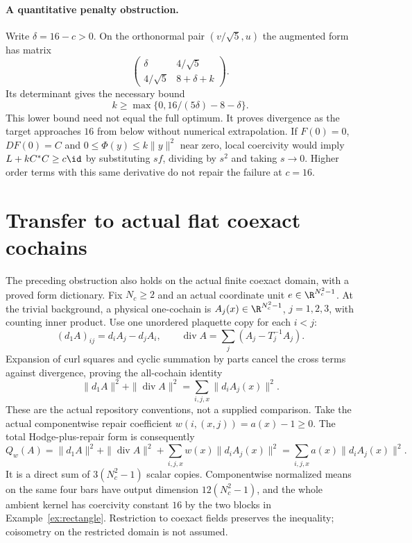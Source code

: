 \paragraph{A quantitative penalty obstruction.}
Write $\delta=16-c>0$. On the orthonormal pair $(v/\sqrt5,u)$ the
augmented form has matrix
\[
 \begin{pmatrix}\delta&4/\sqrt5\\4/\sqrt5&8+\delta+k\end{pmatrix}.
\]
Its determinant gives the necessary bound
\begin{equation}\label{eq:blowup}
 k\geq\max\{0,16/(5\delta)-8-\delta\}.
\end{equation}
This lower bound need not equal the full optimum. It proves divergence
as the target approaches $16$ from below without numerical extrapolation.
If $F(0)=0$, $DF(0)=C$ and $0\leq\Phi(y)\leq k\|y\|^2$ near zero,
local coercivity would imply $L+kC^*C\geq c\id$ by substituting $sf$,
dividing by $s^2$ and taking $s\to0$. Higher order terms with this same
derivative do not repair the failure at $c=16$.

\section{Transfer to actual flat coexact cochains}
The preceding obstruction also holds on the actual finite coexact domain,
with a proved form dictionary. Fix $N_c\geq2$ and an actual coordinate unit
$e\in\R^{N_c^2-1}$. At the trivial background, a physical one-cochain is
$A_j(x)\in\R^{N_c^2-1}$, $j=1,2,3$, with counting inner product. Use one
unordered plaquette copy for each $i<j$:
\[
 (d_1 A)_{ij}=d_iA_j-d_jA_i,\qquad
 \operatorname{div}A=\sum_j(A_j-T_j^{-1}A_j).
\]
Expansion of curl squares and cyclic summation by parts cancel the cross
terms against divergence, proving the all-cochain identity
\[
 \|d_1A\|^2+\|\operatorname{div}A\|^2=\sum_{i,j,x}\|d_iA_j(x)\|^2.
\]
These are the actual repository conventions, not a supplied comparison.
Take the actual componentwise repair coefficient $w(i,(x,j))=a(x)-1\geq0$.
The total Hodge-plus-repair form is consequently
\begin{equation}\label{eq:physical-dictionary}
 Q_w(A)=\|d_1A\|^2+\|\operatorname{div}A\|^2+
 \sum_{i,j,x}w(x)\|d_iA_j(x)\|^2
 =\sum_{i,j,x}a(x)\|d_iA_j(x)\|^2.
\end{equation}
It is a direct sum of $3(N_c^2-1)$ scalar copies. Componentwise normalized
means on the same four bars have output dimension $12(N_c^2-1)$, and
the whole ambient kernel has coercivity constant $16$ by the two blocks
in Example~\ref{ex:rectangle}. Restriction to coexact fields preserves the
inequality; coisometry on the restricted domain is not assumed.

